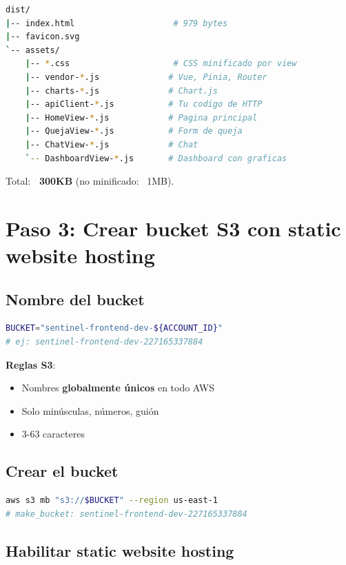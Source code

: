 \documentclass[11pt,a4paper,oneside]{article}
\begin{document}
\begin{lstlisting}[language=bash,caption={web-dist}]
dist/
|-- index.html                    # 979 bytes
|-- favicon.svg
`-- assets/
    |-- *.css                     # CSS minificado por view
    |-- vendor-*.js              # Vue, Pinia, Router
    |-- charts-*.js              # Chart.js
    |-- apiClient-*.js           # Tu codigo de HTTP
    |-- HomeView-*.js            # Pagina principal
    |-- QuejaView-*.js           # Form de queja
    |-- ChatView-*.js            # Chat
    `-- DashboardView-*.js       # Dashboard con graficas
\end{lstlisting}

Total: \textbf{~300KB} (no minificado: ~1MB).

\section{Paso 3: Crear bucket S3 con static website hosting}

\subsection{Nombre del bucket}

\begin{lstlisting}[language=bash]
BUCKET="sentinel-frontend-dev-${ACCOUNT_ID}"
# ej: sentinel-frontend-dev-227165337884
\end{lstlisting}

\textbf{Reglas S3}:
\begin{itemize}
  \item Nombres \textbf{globalmente \'unicos} en todo AWS
  \item Solo min\'usculas, n\'umeros, gui\'on
  \item 3-63 caracteres
\end{itemize}

\subsection{Crear el bucket}

\begin{lstlisting}[language=bash]
aws s3 mb "s3://$BUCKET" --region us-east-1
# make_bucket: sentinel-frontend-dev-227165337884
\end{lstlisting}

\subsection{Habilitar static website hosting}
\end{document}
